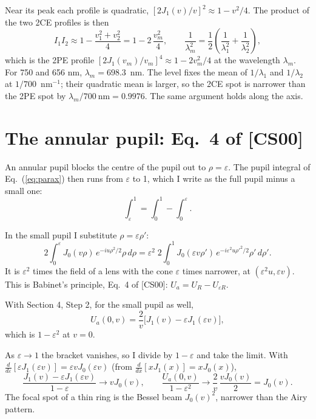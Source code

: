 \documentclass[11pt]{article}
\begin{document}
 Near its peak each profile is quadratic,
$[2J_1(v)/v]^2 \approx 1 - v^2/4$. The product of the two 2CE profiles is then
\begin{equation}I_1I_2 \approx 1 - \frac{v_1^2 + v_2^2}{4} = 1 - 2\,\frac{v_m^2}{4},\qquad
\frac{1}{\lambda_m^2} = \frac12\left(\frac{1}{\lambda_1^2} + \frac{1}{\lambda_2^2}\right) ,\end{equation}
which is the 2PE profile $[2J_1(v_m)/v_m]^4 \approx 1 - 2v_m^2/4$ at the wavelength $\lambda_m$. For 750 and 656 nm,
$\lambda_m = 698.3$~nm. The level fixes the mean of $1/\lambda_1$ and $1/\lambda_2$ at $1/700$~nm$^{-1}$; their quadratic
mean is larger, so the 2CE spot is narrower than the 2PE spot by $\lambda_m/700\ \mathrm{nm} = 0.9976$. The same argument
holds along the axis.


\section{The annular pupil: Eq.~4 of [CS00]}
 An annular pupil blocks the centre of the pupil out to $\rho = \varepsilon$. The pupil integral of
Eq.~(\ref{eq:parax}) then runs from $\varepsilon$ to 1, which I write as the full pupil minus a small one:
\begin{equation}\int_\varepsilon^1 = \int_0^1 - \int_0^\varepsilon .\end{equation}

 In the small pupil I substitute $\rho = \varepsilon\rho'$:
\begin{equation}2\int_0^\varepsilon J_0(v\rho)\,e^{-iu\rho^2/2}\rho\,d\rho
= \varepsilon^2\;2\int_0^1 J_0(\varepsilon v\rho')\,e^{-i\varepsilon^2u\rho'^2/2}\rho'\,d\rho' .\end{equation}
It is $\varepsilon^2$ times the field of a lens with the cone $\varepsilon$ times narrower, at $(\varepsilon^2u,
\varepsilon v)$. This is Babinet's principle, Eq.~4 of [CS00]: $U_a = U_R - U_{\varepsilon R}$.

 With Section 4, Step 2, for the small pupil as well,
\begin{equation}U_a(0,v) = \frac{2}{v}\Big[J_1(v) - \varepsilon J_1(\varepsilon v)\Big] ,\end{equation}
which is $1 - \varepsilon^2$ at $v = 0$.

 As $\varepsilon \to 1$ the bracket vanishes, so I divide by $1 - \varepsilon$
and take the limit. With $\frac{d}{d\varepsilon}[\varepsilon J_1(\varepsilon v)] = \varepsilon vJ_0(\varepsilon v)$
(from $\frac{d}{dx}[xJ_1(x)] = xJ_0(x)$),
\begin{equation}\frac{J_1(v) - \varepsilon J_1(\varepsilon v)}{1 - \varepsilon} \to vJ_0(v),\qquad
\frac{U_a(0,v)}{1 - \varepsilon^2} \to \frac{2}{v}\,\frac{vJ_0(v)}{2} = J_0(v) .\end{equation}
The focal spot of a thin ring is the Bessel beam $J_0(v)^2$, narrower than the Airy pattern.
\end{document}
